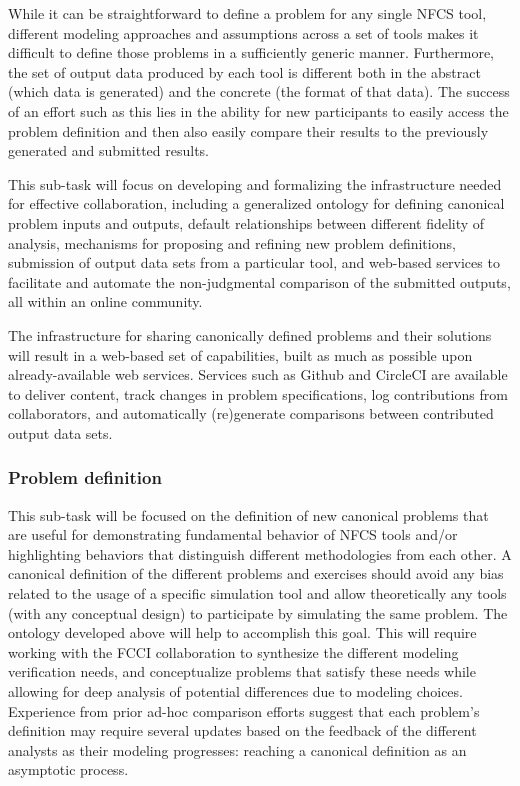 While it can be straightforward to define a problem for any single \gls{NFCS} tool,
different modeling approaches and assumptions across a set of tools makes it
difficult to define those problems in a sufficiently generic manner.
Furthermore, the set of output data produced by each tool is different both in
the abstract (which data is generated) and the concrete (the format of that
data). The success of an effort such as this lies in the ability for new
participants to easily access the problem definition and then also easily
compare their results to the previously generated and submitted results.

This sub-task will focus on developing and formalizing the infrastructure
needed for effective collaboration, including a generalized ontology for
defining canonical problem inputs and outputs, default relationships between
different fidelity of analysis, mechanisms for proposing and refining new
problem definitions, submission of output data sets from a particular tool,
and web-based services to facilitate and automate the non-judgmental
comparison of the submitted outputs\cite{scopatz.NT.2016}, all within
an online community.

The infrastructure for sharing canonically defined problems and their
solutions will result in a web-based set of capabilities, built as much as
possible upon already-available web services.  Services such as
Github\cite{github} and CircleCI\cite{circleci} are available to deliver
content, track changes in problem specifications, log contributions from
collaborators, and automatically (re)generate comparisons between contributed
output data sets.


\subsubsection{Problem definition} 

This sub-task will be focused on the definition of new canonical problems that are
useful for demonstrating fundamental behavior of \gls{NFCS} tools and/or
highlighting behaviors that distinguish different methodologies from each
other. A canonical definition of the different problems and exercises should
avoid any bias related to the usage of a specific simulation tool and allow
theoretically any tools (with any conceptual design) to participate by
simulating the same problem. The ontology developed above will help to
accomplish this goal. This will require working with the \gls{FCCI}
collaboration to synthesize the different modeling verification needs, and
conceptualize problems that satisfy these needs while allowing for deep
analysis of potential differences due to modeling choices.  Experience from
prior ad-hoc comparison efforts suggest that each problem’s definition may
require several updates based on the feedback of the different analysts as
their modeling progresses: reaching a canonical definition as an asymptotic
process.

